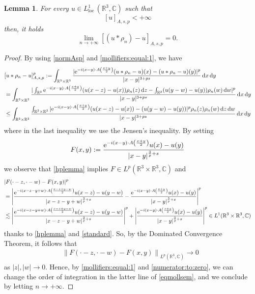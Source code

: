 \documentclass[leqno,11pt]{amsart}
\newcommand{\R}{\mathbb R}
\newcommand{\CC}{\mathbb C}
\newcommand{\C}{\mathbb C}
\newcommand{\loc}{\mathrm{loc}\,}
\numberwithin{equation}{section}
\newtheorem{lemma}[theorem]{Lemma}
\def\e{{\rm e}}
\newcommand{\expAminus}{\e^{-i(x-y)\cdot A\left(\frac{x+y}{2}\right)}}
\begin{document}
\begin{lemma}
\label{Friedrichs:mollifier:lemma}
    For every $u \in L^1_\loc(\R^3,\CC)$ such that
    \begin{equation}\label{hplemma}
        [u]_{A,s,p} < +\infty
    \end{equation}
    then, it holds
    \begin{equation}
        \lim_{n \to +\infty}  [(u*\rho_n)-u]_{A,s,p}=0.
    \end{equation}
\end{lemma}

\begin{proof}
    By using \eqref{normAsp} and \eqref{mollifiers:equal:1}, we have
{\small \begin{equation}\label{eqmollsem}\begin{aligned}
&[u\ast \rho_n-u]_{A,s,p}^p:=\int_{\R^3 \times \R^3}\frac{|\expAminus (u\ast \rho_n-u)(x) -  (u\ast \rho_n-u)(y)|^p}{|x-y|^{3+ps}} \dd x \dd y \\
&=\int_{\R^3 \times \R^3}\frac{|\int_{\R^3}\expAminus(u(x-z)-u(x))\rho_n(z) \dd z -  \int_{\R^3}(u(y-w)-u(y))\rho_n(w) \dd w|^p}{|x-y|^{3+ps}} \dd x \dd y \\
&\le \int_{\R^3 \times \R^3}\frac{\int_{\R^3 \times \R^3}|\expAminus(u(x-z)-u(x)) -  (u(y-w)-u(y))|^p\rho_n(z)\rho_n(w) \dd z \dd w}{|x-y|^{3+ps}} \dd x \dd y 
\end{aligned}\end{equation}}
where in the last inequality we use the Jensen's inequality.
By setting
\begin{equation}
    F(x,y):=\frac{\expAminus u(x)- u(y)}{|x-y|^{\frac3p+s}}
\end{equation}
we observe that \eqref{hplemma} implies $F \in L^p(\R^3 \times \R^3,\CC)$ and 
\begin{equation}
    \begin{aligned}
        &|F(\cdot-z,\cdot-w)-F(x,y)|^p\\
        &= 
        \left|\frac{\e^{-i(x-z-y+w)\cdot A\left(\frac{x-z+y-w}{2} \right)}u(x-z)- u(y-w)}{|x-z-y+w|^{\frac3p + s}}- \frac{\expAminus u(x)- u(y)}{|x-y|^{\frac3p + s}}\right|^p\\
        &\lesssim
        \left|\frac{\e^{-i(x-z-y+w)\cdot A\left(\frac{x-z+y-w}{2} \right)}u(x-z)- u(y-w)}{|x-z-y+w|^{\frac3p + s}}\right|^p
        +
        \left|\frac{\expAminus u(x)- u(y)}{|x-y|^{\frac3p + s}}\right|^p \in L^1(\R^3 \times \R^3,\CC)
    \end{aligned}
\end{equation}
thanks to \eqref{hplemma} and \eqref{standard}. So, by the Dominated Convergence Theorem, it follows that
\begin{equation}
\label{numerator:to:zero}
\begin{aligned}
    &\left\|F(\cdot-z,\cdot-w)-F(x,y) \right\|_{L^p(\R^3,\C)}\to 0
\end{aligned}\end{equation}
as $|z|,|w| \to 0$.
Hence, by \eqref{mollifiers:equal:1} and \eqref{numerator:to:zero}, we can change the order of integration in the latter line of \eqref{eqmollsem}, and we conclude by letting $n \to +\infty$.
\end{proof}
\end{document}
